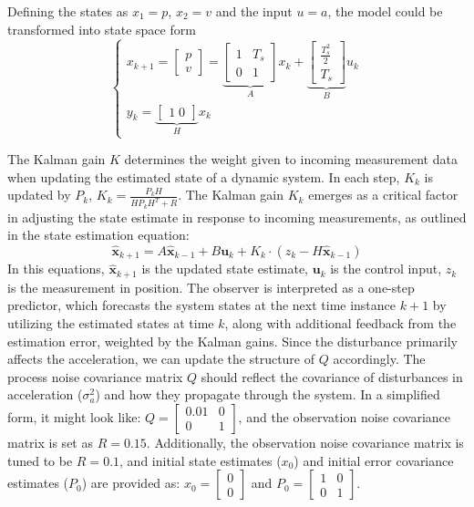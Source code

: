 Defining the states as $x_1 = p$, $x_2 = v$ and the input $u = a$, the model could be transformed into state space form
\begin{equation}
    \begin{cases} 
    x_{k+1} = \begin{bmatrix}p \\v \end{bmatrix} = \underbrace{\begin{bmatrix}1 & T_s \\0 & 1\end{bmatrix}}_{A} x_k + \underbrace{\begin{bmatrix}\frac{T_s^2}{2}  \\T_s \end{bmatrix}}_{B} u_k \\
    y_k = \underbrace{\begin{bmatrix}1\;0\end{bmatrix}}_{H} x_k
    \end{cases}
    \label{eq:kf_state}
\end{equation}

The Kalman gain $K$ determines the weight given to incoming measurement data when updating the estimated state of a dynamic system. In each step, $K_k$ is updated by $P_k$, $K_k=\frac{P_kH}{HP_kH^T+R}$. The Kalman gain $K_k$ emerges as a critical factor in adjusting the state estimate in response to incoming measurements, as outlined in the state estimation equation:
\begin{equation}
    \hat{\mathbf{x}}_{k+1} = A\hat{\mathbf{x}}_{k-1} + B\mathbf{u}_k + K_k\cdot(z_k - H\hat{\mathbf{x}}_{k-1})
    \label{eq:kf_est}
\end{equation} 
In this equations, $\hat{\mathbf{x}}_{k+1}$ is the updated state estimate, $\mathbf{u}_k$ is the control input, $z_k$ is the measurement in position. The observer is interpreted as a one-step predictor, which forecasts the system states at the next time instance $k+1$ by utilizing the estimated states at time $k$, along with additional feedback from the estimation error, weighted by the Kalman gains. Since the disturbance primarily affects the acceleration, we can update the structure of $Q$ accordingly. The process noise covariance matrix $Q$ should reflect the covariance of disturbances in acceleration ($\sigma_a^2$) and how they propagate through the system. In a simplified form, it might look like: $Q = \begin{bmatrix}0.01 & 0 \\0 & 1\end{bmatrix}$, and the observation noise covariance matrix is set as $R = 0.15$. Additionally, the observation noise covariance matrix is tuned to be $R = 0.1$, and initial state estimates ($x_0$) and initial error covariance estimates ($P_0$) are provided as: $x_0 = \begin{bmatrix} 0 \\ 0 \end{bmatrix}$ and $P_0 = \begin{bmatrix}1 & 0 \\0 & 1\end{bmatrix}$. 

